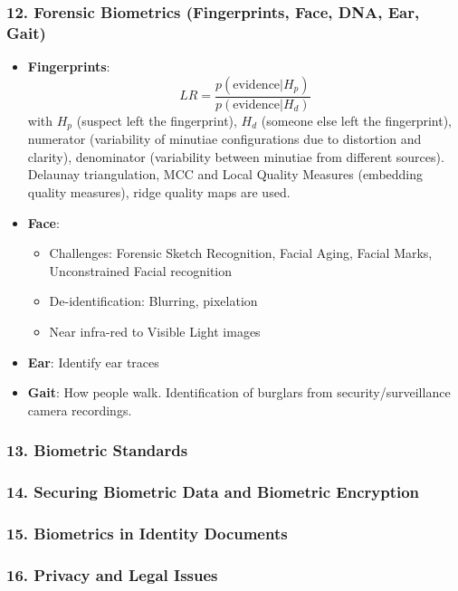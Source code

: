 \documentclass[a4paper]{article}
\begin{document}
    \subsubsection*{12. Forensic Biometrics (Fingerprints, Face, DNA, Ear, Gait)}
      \begin{itemize}
        \item \textbf{Fingerprints}: $$LR = \frac{p(\text{evidence}|H_p)}{p(\text{evidence}|H_d)}$$
        with $H_p$ (suspect left the fingerprint), $H_d$ (someone else left the fingerprint), numerator (variability of minutiae configurations due to distortion and clarity), denominator (variability between minutiae from different sources). Delaunay triangulation, MCC and Local Quality Measures (embedding quality measures), ridge quality maps are used.
        \item \textbf{Face}:
        \begin{itemize}
          \item Challenges: Forensic Sketch Recognition, Facial Aging, Facial Marks, Unconstrained Facial recognition
          \item De-identification: Blurring, pixelation
          \item Near infra-red to Visible Light images
        \end{itemize}
        \item \textbf{Ear}: Identify ear traces
        \item \textbf{Gait}: How people walk. Identification of burglars from security/surveillance camera recordings.
      \end{itemize}
    \subsubsection*{13. Biometric Standards}
    \subsubsection*{14. Securing Biometric Data and Biometric Encryption}
    \subsubsection*{15. Biometrics in Identity Documents}
    \subsubsection*{16. Privacy and Legal Issues}
\end{document}
